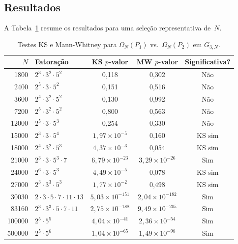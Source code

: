 \documentclass[12pt,a4paper]{article}
\theoremstyle{remark}
\begin{document}
	\subsection{Resultados}
	
	A Tabela~\ref{tab:omega} resume os resultados para uma seleção representativa
	de~$N$.
	
	\begin{table}[htbp]
		\centering
		\begin{tabular}{r l c c c}
			\toprule
			$N$ & Fatoração & KS $p$-valor & MW $p$-valor & Significativa? \\
			\midrule
			1800   & $2^3\cdot3^2\cdot5^2$               & 0,118        & 0,302        & Não    \\
			2400   & $2^5\cdot3\cdot5^2$                 & 0,151        & 0,516        & Não    \\
			3600   & $2^4\cdot3^2\cdot5^2$               & 0,130        & 0,992        & Não    \\
			7200   & $2^5\cdot3^2\cdot5^2$               & 0,800        & 0,563        & Não    \\
			12000  & $2^5\cdot3\cdot5^3$                 & 0,254        & 0,330        & Não    \\
			15000  & $2^3\cdot3\cdot5^4$                 & $1{,}97\times10^{-5}$  & 0,160        & KS sim \\
			18000  & $2^4\cdot3^2\cdot5^3$               & $4{,}37\times10^{-3}$  & 0,054        & KS sim \\
			21000  & $2^3\cdot3\cdot5^3\cdot7$           & $6{,}79\times10^{-23}$ & $3{,}29\times10^{-26}$ & Sim    \\
			24000  & $2^6\cdot3\cdot5^3$                 & $4{,}49\times10^{-5}$  & 0,078        & KS sim \\
			27000  & $2^3\cdot3^3\cdot5^3$               & $1{,}77\times10^{-2}$  & 0,498        & KS sim \\
			30030  & $2\cdot3\cdot5\cdot7\cdot11\cdot13$ & $5{,}03\times10^{-151}$& $2{,}04\times10^{-182}$& Sim    \\
			83160  & $2^3\cdot3^3\cdot5\cdot7\cdot11$   & $2{,}75\times10^{-188}$& $9{,}49\times10^{-205}$& Sim    \\
			100000 & $2^5\cdot5^5$                       & $4{,}04\times10^{-41}$ & $2{,}36\times10^{-54}$ & Sim    \\
			500000 & $2^5\cdot5^6$                       & $1{,}04\times10^{-65}$ & $1{,}49\times10^{-98}$ & Sim    \\
			\bottomrule
		\end{tabular}
		\caption{Testes KS e Mann-Whitney para $\Omega_N(P_1)$ vs.\ $\Omega_N(P_2)$ em $G_{3,N}$.}
		\label{tab:omega}
	\end{table}
	
\end{document}
